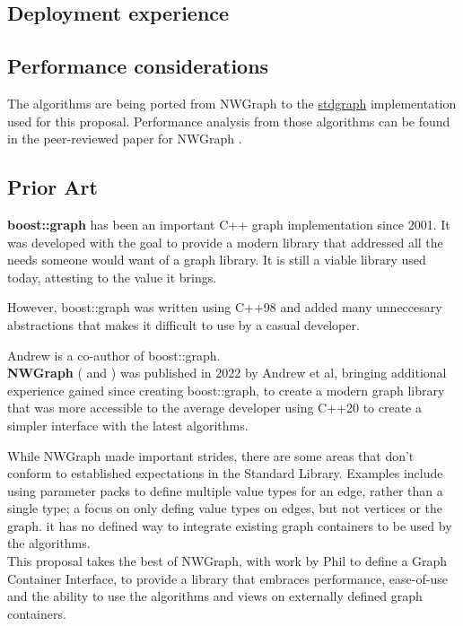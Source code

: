 \documentclass[10pt,onecolumn]{article}
\begin{document}
\subsection{Deployment experience}
\subsection{Performance considerations}
The algorithms are being ported from NWGraph to the \href{https://github.com/stdgraph}{stdgraph} implementation used for this proposal. Performance analysis from those algorithms can be found in the peer-reviewed paper for NWGraph \cite{REF_nwgraph_paper}.

\subsection{Prior Art}
\textbf{boost::graph} has been an important C++ graph implementation since 2001. It was developed with the goal to provide
a modern library that addressed all the needs someone would want of a graph library. It is still a viable library used today,
attesting to the value it brings.

However, boost::graph was written using C++98 and added many unneccesary abstractions that makes it difficult
to use by a casual developer. 

Andrew is a co-author of boost::graph.
\\

\textbf{NWGraph} (\cite{REF_nwgraph_library} and \cite{REF_nwgraph_paper}) was published in 2022
by Andrew et al, bringing additional experience gained since creating boost::graph, to create a modern graph library that
was more accessible to the average developer using C++20 to create a simpler interface with the latest algorithms.

While NWGraph made
important strides, there are some areas that don't conform to established expectations in the Standard Library. Examples
include using parameter packs to define multiple value types for an edge, rather than a single type; a focus on only defing value types on edges, but not vertices or the graph. it has no defined way to
integrate existing graph containers to be used by the algorithms.
\\

This proposal takes the best of NWGraph, with work by Phil to define a Graph Container Interface, to provide a library that
embraces performance, ease-of-use and the ability to use the algorithms and views on externally defined graph containers.
\end{document}
